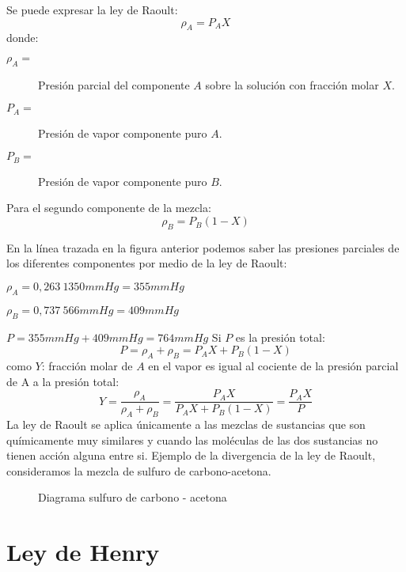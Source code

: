 \documentclass[11pt,openany]{book}
\begin{document}
 Se puede expresar la ley de Raoult:
\begin{equation}\rho_A=P_A X\end{equation}
donde:
\begin{description}
  \item [$\rho_A=$] {Presión parcial del componente $A$ sobre la solución con fracción molar $X$.} 
  \item [$P_A=$] {Presión de vapor componente puro $A$.}
  \item [$P_B=$] {Presión de vapor componente puro $B$.}
  
\end{description}
Para el segundo componente de la mezcla:
\begin{equation}\rho_B=P_B (1-X)\end{equation}

En la línea trazada en la figura anterior podemos saber las presiones parciales de los diferentes
 componentes por medio de la ley de Raoult:

$\rho_A=0,263\ 1350mmHg = 355mmHg$

$\rho_B= 0,737\ 566mmHg = 409mmHg$

$P = 355mmHg + 409mmHg = 764 mmHg$ 
Si $P$ es la presión total:
\begin{equation}
P=\rho_A + \rho_B = P_A X+P_B (1-X)
\end{equation}
como $Y$: fracción molar de $A$ en el vapor es igual al cociente de la presión parcial de A a la presión total:
\begin{equation}
Y=\frac{\rho_A}{\rho_A+\rho_B}=\frac{P_A X}{P_A X+P_B (1-X)}=\frac{P_A X}{P}
\end{equation}
La ley de Raoult se aplica únicamente a las mezclas de sustancias que son químicamente muy similares 
y cuando las moléculas de las dos sustancias no tienen acción alguna entre si. Ejemplo de la 
divergencia de la ley de Raoult, consideramos la mezcla de sulfuro de carbono-acetona.

\begin{figure}[h] \label{fig:car-acet}
  \centering
  
  \caption{Diagrama sulfuro de carbono - acetona}  
\end{figure}
 

\section{Ley de Henry}
\end{document}
